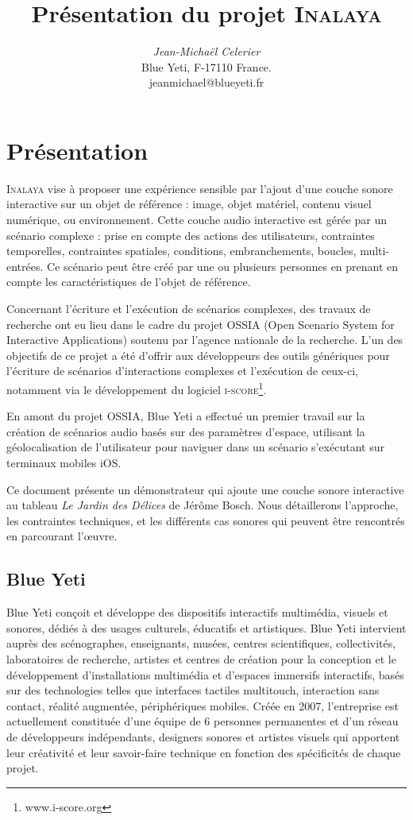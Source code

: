 \documentclass{article}
\title{Présentation du projet \textsc{Inalaya}}
\author{\emph{Jean-Michaël Celerier} \\  Blue Yeti, F-17110 France. \\ jeanmichael@blueyeti.fr }
\date{}
\begin{document}
    \maketitle
    \section*{Présentation}
    \textsc{Inalaya} vise à proposer une expérience sensible par l’ajout d’une couche sonore interactive sur 
    un objet de référence : image, objet matériel, contenu visuel numérique, ou environnement.
    Cette couche audio interactive est gérée par un scénario complexe : prise en compte 
    des  actions des utilisateurs, contraintes temporelles, contraintes spatiales, conditions, 
    embranchements, boucles, multi-entrées. 
    Ce scénario peut être créé par une ou plusieurs personnes en prenant en compte les caractéristiques de l’objet de référence.
    
    Concernant l’écriture et l’exécution de scénarios complexes, des travaux de recherche ont eu lieu 
    dans le cadre du projet \textsc{OSSIA} (Open Scenario System for Interactive Applications) soutenu 
    par l’agence nationale de la recherche.
    L’un des objectifs de ce projet a été d’offrir aux développeurs des outils génériques pour l’écriture de scénarios d’interactions complexes et l’exécution de ceux-ci, notamment via le développement du logiciel \textsc{i-score}\footnote{www.i-score.org}.
    
    En amont du projet OSSIA, Blue Yeti a effectué un premier travail sur la création de scénarios 
    audio basés sur des paramètres d’espace, utilisant la géolocalisation de l’utilisateur pour 
    naviguer dans un scénario s’exécutant sur terminaux mobiles iOS.
    
    Ce document présente un démonstrateur qui ajoute une couche sonore interactive au tableau \emph{Le Jardin des Délices} de Jérôme Bosch.
    Nous détaillerons l'approche, les contraintes techniques, et les différents cas sonores qui peuvent être rencontrés en parcourant l'\oe uvre.

    \subsection*{Blue Yeti}
    Blue Yeti conçoit et développe des dispositifs interactifs multimédia, visuels et sonores, dédiés à des usages culturels, éducatifs et artistiques.
    Blue Yeti intervient auprès des scénographes, enseignants, musées, centres scientifiques, collectivités, laboratoires de recherche, artistes et centres de création pour la conception et le développement d'installations multimédia et d’espaces immersifs interactifs, basés sur des technologies telles que interfaces tactiles multitouch, interaction sans contact, réalité augmentée, périphériques mobiles.
    Créée en 2007, l'entreprise est actuellement constituée d’une équipe de 6 personnes permanentes et d’un réseau de développeurs indépendants, designers sonores et artistes visuels qui apportent leur créativité et leur savoir-faire technique en fonction des spécificités de chaque projet.
    
\end{document}
